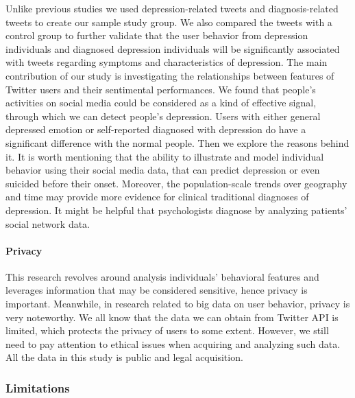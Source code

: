 \documentclass[]{article}
\let\oldparagraph\paragraph
\renewcommand{\paragraph}[1]{\oldparagraph{#1}\mbox{}}
\begin{document}
Unlike previous studies we used depression-related tweets and
diagnosis-related tweets to create our sample study group. We also
compared the tweets with a control group to further validate that the
user behavior from depression individuals and diagnosed depression
individuals will be significantly associated with tweets regarding
symptoms and characteristics of depression. The main contribution of our
study is investigating the relationships between features of Twitter
users and their sentimental performances. We found that people's
activities on social media could be considered as a kind of effective
signal, through which we can detect people's depression. Users with
either general depressed emotion or self-reported diagnosed with
depression do have a significant difference with the normal people. Then
we explore the reasons behind it. It is worth mentioning that the
ability to illustrate and model individual behavior using their social
media data, that can predict depression or even suicided before their
onset. Moreover, the population-scale trends over geography and time may
provide more evidence for clinical traditional diagnoses of depression.
It might be helpful that psychologists diagnose by analyzing patients'
social network data.

\hypertarget{privacy}{%
\paragraph{Privacy}\label{privacy}}

This research revolves around analysis individuals' behavioral features
and leverages information that may be considered sensitive, hence
privacy is important. Meanwhile, in research related to big data on user
behavior, privacy is very noteworthy. We all know that the data we can
obtain from Twitter API is limited, which protects the privacy of users
to some extent. However, we still need to pay attention to ethical
issues when acquiring and analyzing such data. All the data in this
study is public and legal acquisition.

\hypertarget{limitations}{%
\subsubsection{Limitations}\label{limitations}}
\end{document}
